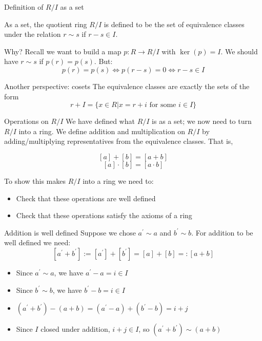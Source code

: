 \documentclass{beamer}
\begin{document}
\begin{frame}{Definition of $R/I$ as a set}

As a set, the quotient ring $R/I$ is defined to be the set of equivalence classes under the relation $r\sim s$ if $r-s\in I$.

\begin{block}{Why?}
  Recall we want to build a map $p:R\to R/I$ with $\ker(p)=I$. We should have $r\sim s$ if $p(r)=p(s)$.  But:
  $$p(r)=p(s)\iff p(r-s)=0\iff r-s\in I$$
\end{block}
\begin{block}{Another perspective: cosets}
  The equivalence classes are exactly the sets of the form
  $$r+I=\{x\in R | x=r+i \text{ for some } i\in I\}$$
  \end{block}

\end{frame}


\begin{frame}{Operations on $R/I$}
We have defined what $R/I$ is as a set; we now need to turn $R/I$ into a ring.  We define addition and multiplication on $R/I$ by adding/multiplying representatives from the equivalence classes.  That is, 

$$[a]+[b]=[a+b]$$
$$[a]\cdot [b]=[a\cdot b]$$

\begin{block}{To show this makes $R/I$ into a ring we need to:}
\begin{itemize}
\item Check that these operations are well defined
\item Check that these operations satisfy the axioms of a ring
\end{itemize}
\end{block}

\end{frame}

\begin{frame}{Addition is well defined}
Suppose we chose $a^\prime\sim a$ and $b^\prime \sim b$.  For addition to be well defined we need:
$$[a^\prime+b^\prime]:=[a^\prime]+[b^\prime]=[a]+[b]=:[a+b]$$

\begin{itemize}
\item Since $a^\prime \sim a$, we have $a^\prime-a=i\in I$
\item Since $b^\prime \sim b$, we have $b^\prime-b=i\in I$ 
\item $(a^\prime+b^\prime)-(a+b)=(a^\prime-a)+(b^\prime-b)=i+j$
\item Since $I$ closed under addition, $i+j\in I$, so $(a^\prime+b^\prime)\sim (a+b)$
\end{itemize}

\end{frame}
\end{document}
